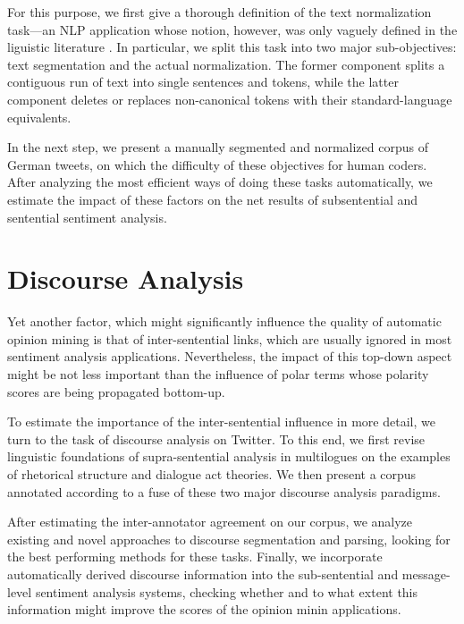 \documentclass{article}
\begin{document}
For this purpose, we first give a thorough definition of the text
normalization task---an NLP application whose notion, however, was
only vaguely defined in the liguistic literature \cite{Eisenstein:13}.
In particular, we split this task into two major sub-objectives: text
segmentation and the actual normalization.  The former component
splits a contiguous run of text into single sentences and tokens,
while the latter component deletes or replaces non-canonical tokens
with their standard-language equivalents.

In the next step, we present a manually segmented and normalized
corpus of German tweets, on which the difficulty of these objectives
for human coders.  After analyzing the most efficient ways of doing
these tasks automatically, we estimate the impact of these factors on
the net results of subsentential and sentential sentiment analysis.

\section*{Discourse Analysis}
Yet another factor, which might significantly influence the quality of
automatic opinion mining is that of inter-sentential links, which are
usually ignored in most sentiment analysis applications.
Nevertheless, the impact of this top-down aspect might be not less
important than the influence of polar terms whose polarity scores are
being propagated bottom-up.

To estimate the importance of the inter-sentential influence in more
detail, we turn to the task of discourse analysis on Twitter.  To this
end, we first revise linguistic foundations of supra-sentential
analysis in multilogues on the examples of rhetorical structure and
dialogue act theories.  We then present a corpus annotated according
to a fuse of these two major discourse analysis paradigms.

After estimating the inter-annotator agreement on our corpus, we
analyze existing and novel approaches to discourse segmentation and
parsing, looking for the best performing methods for these tasks.
Finally, we incorporate automatically derived discourse information
into the sub-sentential and message-level sentiment analysis systems,
checking whether and to what extent this information might improve the
scores of the opinion minin applications.



\end{document}
